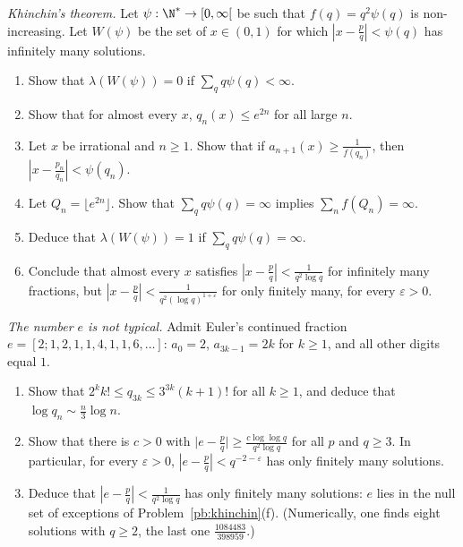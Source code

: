 \begin{exercise}[Journey]\label{pb:khinchin}
\emph{Khinchin's theorem.} Let $\psi:\N^*\to[0,\infty[$ be such that $f(q)=q^2\psi(q)$ is non-increasing. Let $W(\psi)$ be the set of
$x\in(0,1)$ for which $|x-\frac pq|<\psi(q)$ has infinitely many solutions.
\begin{enumerate}[label=(\alph*)]
\item Show that $\lambda(W(\psi))=0$ if $\sum_qq\psi(q)<\infty$.
\item Show that for almost every $x$, $q_n(x)\le e^{2n}$ for all large $n$.
\item Let $x$ be irrational and $n\ge1$. Show that if $a_{n+1}(x)\ge\frac1{f(q_n)}$, then $|x-\frac{p_n}{q_n}|<\psi(q_n)$.
\item Let $Q_n=\lfloor e^{2n}\rfloor$. Show that $\sum_qq\psi(q)=\infty$ implies $\sum_nf(Q_n)=\infty$.
\item Deduce that $\lambda(W(\psi))=1$ if $\sum_qq\psi(q)=\infty$.
\item Conclude that almost every $x$ satisfies $|x-\frac pq|<\frac1{q^2\log q}$ for infinitely many fractions, but
$|x-\frac pq|<\frac1{q^2(\log q)^{1+\varepsilon}}$ for only finitely many, for every $\varepsilon>0$.
\end{enumerate}
\end{exercise}

\begin{exercise}[$\star\star$]\label{pb:econt}
\emph{The number $e$ is not typical.} Admit Euler's continued fraction $e=[2;1,2,1,1,4,1,1,6,\dots]$: $a_0=2$, $a_{3k-1}=2k$ for $k\ge1$, and
all other digits equal $1$.
\begin{enumerate}[label=(\alph*)]
\item Show that $2^kk!\le q_{3k}\le 3^{3k}(k+1)!$ for all $k\ge1$, and deduce that $\log q_n\sim\frac n3\log n$.
\item Show that there is $c>0$ with $\bigl|e-\frac pq\bigr|\ge\frac{c\log\log q}{q^2\log q}$ for all $p$ and $q\ge3$. In particular, for every
$\varepsilon>0$, $|e-\frac pq|<q^{-2-\varepsilon}$ has only finitely many solutions.
\item Deduce that $|e-\frac pq|<\frac1{q^2\log q}$ has only finitely many solutions: $e$ lies in the null set of exceptions of
Problem~\ref{pb:khinchin}(f). (Numerically, one finds eight solutions with $q\ge2$, the last one $\frac{1084483}{398959}$.)
\end{enumerate}
\end{exercise}

